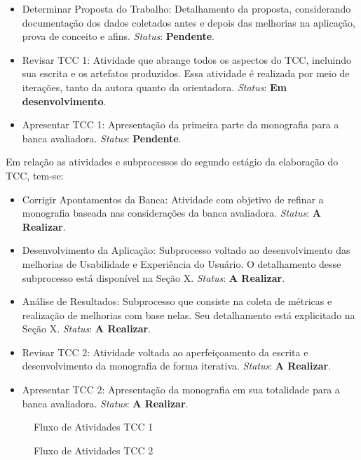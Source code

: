 \begin{itemize}
	\item Determinar Proposta do Trabalho: Detalhamento da proposta, considerando documentação dos dados coletados antes e depois das melhorias na aplicação, prova de conceito e afins. \textit{Status}: \textbf{Pendente}.
	\item Revisar TCC 1: Atividade que abrange todos os aspectos do TCC, incluindo sua escrita e os artefatos produzidos. Essa atividade é realizada por meio de iterações, tanto da autora quanto da orientadora. \textit{Status}: \textbf{Em desenvolvimento}.
	\item Apresentar TCC 1: Apresentação da primeira parte da monografia para a banca avaliadora. \textit{Status}: \textbf{Pendente}.
\end{itemize}

Em relação as atividades e subprocessos do segundo estágio da elaboração do TCC, tem-se:

\begin{itemize}
	\item Corrigir Apontamentos da Banca: Atividade com objetivo de refinar a monografia baseada nas considerações da banca avaliadora. \textit{Status}: \textbf{A Realizar}.
	\item Desenvolvimento da Aplicação: Subprocesso voltado ao desenvolvimento das melhorias de Usabilidade e Experiência do Usuário. O detalhamento desse subprocesso está disponível na Seção X. \textit{Status}: \textbf{A Realizar}.
	\item Análise de Resultados: Subprocesso que consiste na coleta de métricas e realização de melhorias com base nelas. Seu detalhamento está explicitado na Seção X. \textit{Status}: \textbf{A Realizar}.
	\item Revisar TCC 2: Atividade voltada ao aperfeiçoamento da escrita e desenvolvimento da monografia de forma iterativa. \textit{Status}: \textbf{A Realizar}.
	\item Apresentar TCC 2: Apresentação da monografia em sua totalidade para a banca avaliadora. \textit{Status}: \textbf{A Realizar}.
\end{itemize}

\begin{figure}[h!]
	\centering
	\caption{Fluxo de Atividades TCC 1}
	\label{fig04}
\end{figure}

\begin{figure}[h!]
	\centering
	\caption{Fluxo de Atividades TCC 2}
	\label{fig05}
\end{figure}

